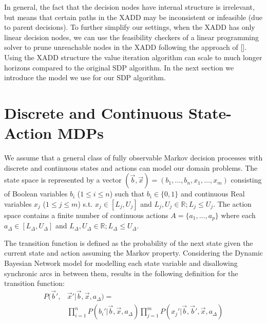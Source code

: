 \documentclass[letterpaper]{article}
\renewcommand{\-}{\text{-}}
\begin{document}
In general, the fact that the decision nodes have internal structure is irrelevant, but means that certain 
paths in the XADD may be inconsistent or infeasible (due to parent decisions).  To further simplify our settings, 
when the XADD has only linear decision nodes, we can use the feasibility checkers of a linear programming solver 
to prune unreachable nodes in the XADD following the approach of []. Using the XADD structure the value
iteration algorithm can scale to much longer horizons compared to the original SDP algorithm. In the next section we introduce the model we use for our SDP algorithm.

\section{Discrete and Continuous State-Action MDPs}

We assume that a general class of fully observable Markov decision processes with discrete and continuous states and actions can model our domain problems.
The state space is represented by a vector $(\vec{b},\vec{x}) = ( b_1,\ldots,b_n,x_{1},\ldots,x_m )$ consisting of Boolean variables
 $b_i$ ($1 \leq i \leq n$) such that $b_i \in \{ 0,1 \}$ and continuous Real variables $x_j$ ($1 \leq j \leq m$) s.t. $x_j \in [L_j,U_j]$ and $L_j,U_j \in
\mathbb{R}; L_j \leq U_j$.  The action space contains a finite number of continuous actions $A
= \{ a_1, \ldots, a_p \}$ where each $a_{\Delta} \in [L_{\Delta},U_{\Delta}]$ and $L_{\Delta},U_{\Delta} \in
\mathbb{R}; L_{\Delta} \leq U_{\Delta}$.

The transition function is defined as the probability of the next state given the current state and action assuming the Markov property.  Considering the Dynamic Bayesian Network model for modelling each state variable and disallowing synchronic arcs in between them,  results in the following definition for the transition function:   
\begin{align}
P(\vec{b}',&\vec{x}'|\vec{b},\vec{x},a_{\Delta}) = \label{eq:dbn} \\
& \prod_{i=1}^n P(b_i'|\vec{b},\vec{x},a_{\Delta}) \prod_{j=1}^m P(x_j'|\vec{b},\vec{b}',\vec{x},a_{\Delta}) \nonumber 
\end{align}
\end{document}
